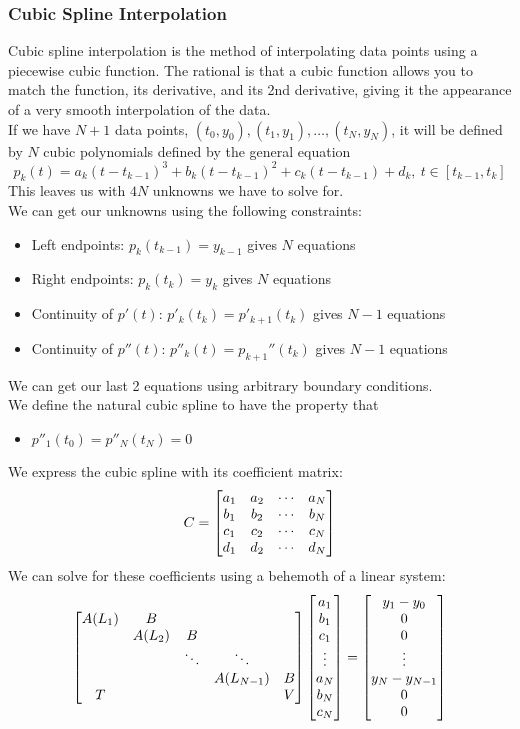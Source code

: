 \documentclass[11pt, fleqn]{article}
\begin{document}
\subsubsection{Cubic Spline Interpolation}
Cubic spline interpolation is the method of interpolating data points using a piecewise cubic function. The rational is that a cubic function allows you to match the function, its derivative, and its 2nd derivative, giving it the appearance of a very smooth interpolation of the data.\\
If we have $N+1$ data points, $(t_0,y_0),(t_1,y_1),\ldots,(t_N,y_N)$, it will be defined by $N$ cubic polynomials defined by the general equation
$$p_k(t)=a_k(t-t_{k-1})^3+b_k(t-t_{k-1})^2+c_k(t-t_{k-1})+d_k,\ t\in[t_{k-1},t_k]$$
This leaves us with $4N$ unknowns we have to solve for.\\
We can get our unknowns using the following constraints:
\begin{itemize}
    \item Left endpoints: $p_k(t_{k-1})=y_{k-1}$ gives $N$ equations
    \item Right endpoints: $p_k(t_k)=y_k$ gives $N$ equations
    \item Continuity of $p'(t)$: $p'_k(t_k)=p'_{k+1}(t_k)$ gives $N-1$ equations
    \item Continuity of $p''(t)$: $p''_k(t)=p_{k+1}''(t_k)$ gives $N-1$ equations
\end{itemize}
We can get our last 2 equations using arbitrary boundary conditions.\\
We define the natural cubic spline to have the property that
\begin{itemize}
    \item $p''_1(t_0)=p''_N(t_N)=0$
\end{itemize}
We express the cubic spline with its coefficient matrix:
$$C=\matrixx{a_1 & a_2 & \cdots & a_N\\ b_1 & b_2 & \cdots & b_N\\ c_1 & c_2 & \cdots & c_N\\ d_1 & d_2 & \cdots & d_N}$$
We can solve for these coefficients using a behemoth of a linear system:
$$\matrixx{A(L_1) & B & & & \\ & A(L_2) & B & & \\ & & \ddots & \ddots & \\ & & & A(L_{N-1}) & B\\ T & & & & V}\matrixx{a_1\\b_1\\c_1\\ \vdots\\ a_N\\b_N\\c_N}=\matrixx{y_1-y_0\\ 0\\0\\\vdots\\ y_N-y_{N-1}\\0\\0}$$
\end{document}
